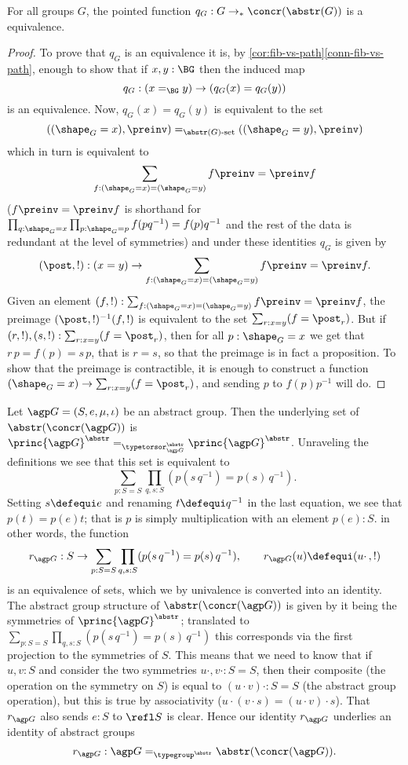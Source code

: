 \begin{lemma}
  \label{lem:Groupsareidentitytypes}
For all groups $G$, the pointed function $q_G:G\to_*\concr(\abstr(G))$
is a  equivalence.
\end{lemma}
\begin{proof}
  To prove that $q_G$ is an equivalence it is, by \cref{cor:fib-vs-path}\ref{conn-fib-vs-path}, enough to show that if $x,y:\BG$ then the induced map
$$q_G:(x=_{\BG}y)\to (q_G(x)=q_G(y))
$$
is an equivalence.
  Now, $q_G(x)=q_G(y)$ is equivalent to the set
$$
((\shape_G=x),\preinv)=_{\abstr(G)\text{-set}}((\shape_G=y),\preinv)$$
which in turn is equivalent to
$$\sum_{f:(\shape_G=x)=(\shape_G=y)}f\preinv=\preinv f
$$
 ($f\preinv=\preinv f$ is shorthand for $\prod_{q:\shape_G=x}\prod_{p:\shape_G=p}f(pq^{-1})=f(p)q^{-1}$ and the rest of the data is redundant at the level of symmetries) and under these identities $q_G$ is given by
$$(\post,!):(x=y)\to \sum_{f:(\shape_G=x)=(\shape_G=y)}f\preinv=\preinv f.$$
Given an element
$(f,!):\sum_{f:(\shape_G=x)=(\shape_G=y)}f\preinv=\preinv f$, the preimage
$(\post,!)^{-1}(f,!)$ is equivalent to the set
$\sum_{r:x=y}(f=\post_r)$.  But if $(r,!),(s,!): \sum_{r:x=y}(f=\post_r)$, then for all $p:\shape_G=x$ we get that $r\,p=f(p)=s\,p$, that is $r=s$, so that the preimage is in fact a proposition.
To show that the preimage is contractible, it is enough to construct a function $(\shape_G=x)\to \sum_{r:x=y}(f=\post_r)$, and sending $p$ to $f(p)p^{-1}$ will do.
\end{proof}

\begin{example}
  \label{ex:abstrconcrG}
  Let ${\agp G}=(S,e,\mu,\iota)$ be an abstract group.
Then the underlying set of $\abstr(\concr({\agp G}))$ is $\princ {\agp G}^\abstr=_{\typetorsor^\abstr_{\agp G}}\princ {\agp G}^\abstr$.
Unraveling the definitions we see that this set is equivalent to
$$\sum_{p:S=S}\prod_{q,s:S}(p(s\,q^{-1})=p(s)\,q^{-1}).
$$
Setting $s\defequi e$ and renaming $t\defequi q^{-1}$ in the last equation, we see that $p(t)=p(e)t$; that is $p$ is simply multiplication with an element $p(e):S$.  in other words, the function
$$r_{\agp G}:S\to  \sum_{p:S=S}\prod_{q,s:S}(p(s\,q^{-1})=p(s)\,q^{-1}),\qquad r_{\agp G}(u)\defequi(u\cdot\,,!)
$$
is an equivalence of sets, which we by univalence is converted into an identity.
The abstract group structure of $\abstr(\concr({\agp G}))$ is given by it being the symmetries of $\princ {\agp G}^\abstr$; translated to $\sum_{p:S=S}\prod_{q,s:S}(p(s\,q^{-1})=p(s)\,q^{-1})$ this corresponds via the first projection to the symmetries of $S$.
This means that we need to know that if $u,v:S$ and consider the two symmetries $u\cdot,v\cdot:S=S$, then their composite (the operation on the symmetry on $S$) is equal to $(u\cdot v)\cdot:S=S$ (the abstract group operation), but this is true by associativity ($u\cdot(v\cdot s)=(u\cdot v)\cdot s$).  That $r_{\agp G}$ also sends $e:S$ to $\refl S$ is clear.
Hence our identity $r_{\agp G}$ underlies an identity of abstract groups
$$r_{\agp G}:{\agp G}=_{\typegroup^\abstr}\abstr(\concr({\agp G})).$$
\end{example}

